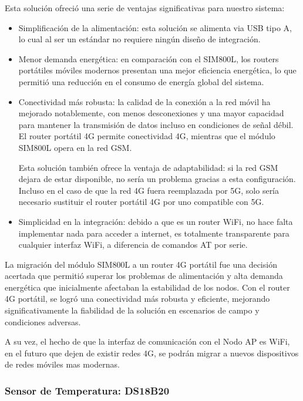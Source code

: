 Esta solución ofreció una serie de ventajas significativas para nuestro sistema:

\begin{itemize}
    \item Simplificación de la alimentación: esta solución se alimenta via USB tipo A, lo cual al ser un estándar no requiere ningún diseño de integración.
    
    \item Menor demanda energética: en comparación con el SIM800L, los routers portátiles móviles modernos presentan una mejor eficiencia energética, lo que permitió una reducción en el consumo de energía global del sistema.
    
    \item Conectividad más robusta: la calidad de la conexión a la red móvil ha mejorado notablemente, con menos desconexiones y una mayor capacidad para mantener la transmisión de datos incluso en condiciones de señal débil. El router portátil 4G permite conectividad 4G, mientras que el módulo SIM800L opera en la red GSM.
    
    Esta solución también ofrece la ventaja de adaptabilidad: si la red GSM dejara de estar disponible, no sería un problema gracias a esta configuración. Incluso en el caso de que la red 4G fuera reemplazada por 5G, solo sería necesario sustituir el router portátil 4G por uno compatible con 5G.
    
    \item Simplicidad en la integración: debido a que es un router WiFi, no hace falta implementar nada para acceder a internet, es totalmente transparente para cualquier interfaz WiFi, a diferencia de comandos AT por serie.
\end{itemize}

La migración del módulo SIM800L a un router 4G portátil fue una decisión acertada que permitió superar los problemas de alimentación y alta demanda energética que inicialmente afectaban la estabilidad de los nodos. Con el router 4G portátil, se logró una conectividad más robusta y eficiente, mejorando significativamente la fiabilidad de la solución en escenarios de campo y condiciones adversas.

A su vez, el hecho de que la interfaz de comunicación con el Nodo AP es WiFi, en el futuro que dejen de existir redes 4G, se podrán migrar a nuevos dispositivos de redes móviles mas modernas.


\subsubsection{Sensor de Temperatura: DS18B20}

